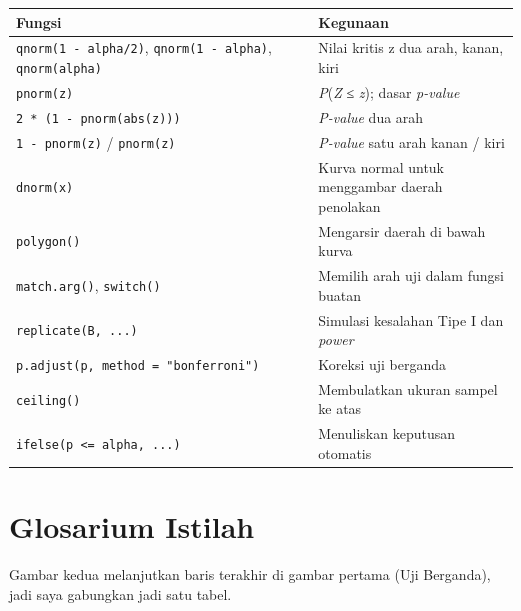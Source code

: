\documentclass[
  indonesian,
  letterpaper,
]{book}
\newcounter{none} %
\begin{document}
{\def\LTcaptype{none} %
\begin{longtable}[]{@{}
  >{\raggedright\arraybackslash}p{}
  >{\raggedright\arraybackslash}p{}@{}}
\toprule\noalign{}
\begin{minipage}[b]{\linewidth}\raggedright
Fungsi
\end{minipage} & \begin{minipage}[b]{\linewidth}\raggedright
Kegunaan
\end{minipage} \\
\midrule\noalign{}
\endhead
\bottomrule\noalign{}
\endlastfoot
\texttt{qnorm(1\ -\ alpha/2)}, \texttt{qnorm(1\ -\ alpha)},
\texttt{qnorm(alpha)} & Nilai kritis z dua arah, kanan, kiri \\
\texttt{pnorm(z)} & \emph{P}(\emph{Z} ≤ \emph{z}); dasar
\emph{p-value} \\
\texttt{2\ *\ (1\ -\ pnorm(abs(z)))} & \emph{P-value} dua arah \\
\texttt{1\ -\ pnorm(z)} / \texttt{pnorm(z)} & \emph{P-value} satu arah
kanan / kiri \\
\texttt{dnorm(x)} & Kurva normal untuk menggambar daerah penolakan \\
\texttt{polygon()} & Mengarsir daerah di bawah kurva \\
\texttt{match.arg()}, \texttt{switch()} & Memilih arah uji dalam fungsi
buatan \\
\texttt{replicate(B,\ ...)} & Simulasi kesalahan Tipe I dan
\emph{power} \\
\texttt{p.adjust(p,\ method\ =\ "bonferroni")} & Koreksi uji berganda \\
\texttt{ceiling()} & Membulatkan ukuran sampel ke atas \\
\texttt{ifelse(p\ \textless{}=\ alpha,\ ...)} & Menuliskan keputusan
otomatis \\
\end{longtable}
}

\section{Glosarium Istilah}\label{glosarium-istilah-1}

Gambar kedua melanjutkan baris terakhir di gambar pertama (Uji
Berganda), jadi saya gabungkan jadi satu tabel.
\end{document}
